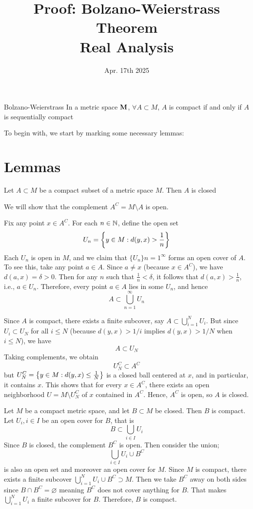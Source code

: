 \documentclass[12pt, letterpaper]{article}
\title{Proof: Bolzano-Weierstrass Theorem\\
Real Analysis}
\date{Apr. 17th 2025}
\begin{document}
\maketitle
\begin{thm}{Bolzano-Weierstrass}
In a metric space $\vb{M}$, $\forall A\subset M$, $A$ is compact if and only if $A$ is sequentially compact
\end{thm}


\begin{prf*}
To begin with, we start by marking some necessary lemmas: \\

\section{Lemmas}
\begin{lem}{Let $A \subset M$ be a compact subset of a metric space $M$. Then $A$ is closed} 
\end{lem}

We will show that the complement $A^C = M \setminus A$ is open.

Fix any point $x \in A^C$. For each $n \in \mathbb{N}$, define the open set
$$U_n = \qty{ y \in M : d(y,x) > \frac{1}{n} }$$
Each $U_n$ is open in $M$, and we claim that $\{ U_n \}{n=1}^\infty$ forms an open cover of $A$. To see this, take any point $a \in A$. Since $a \neq x$ (because $x \in A^C$), we have $d(a,x) = \delta > 0$. Then for any $n$ such that $\frac{1}{n} < \delta$, it follows that $d(a,x) > \frac{1}{n}$, i.e., $a \in U_n$. Therefore, every point $a \in A$ lies in some $U_n$, and hence
$$A \subset \bigcup_{n=1}^\infty U_n$$

Since $A$ is compact, there exists a finite subcover, say $A \subset \bigcup_{i=1}^N U_i$. But since $U_i \subset U_N$ for all $i \leq N$ (because $d(y,x) > 1/i$ implies $d(y,x) > 1/N$ when $i \leq N$), we have
$$A \subset U_N$$
Taking complements, we obtain
$$U_N^C \subset A^C$$
but $U_N^C = \qty{ y \in M : d(y,x) \leq \frac{1}{N} }$ is a closed ball centered at $x$, and in particular, it contains $x$. This shows that for every $x \in A^C$, there exists an open neighborhood $U = M \setminus U_N^C$ of $x$ contained in $A^C$. Hence, $A^C$ is open, so $A$ is closed.\\


\begin{lem}{Let $M$ be a compact metric space, and let $B \subset M$ be closed. Then $B$ is compact.}\\

Let $U_i, i\in I$ be an open cover for $B$, that is
$$B\subset \bigcup_{i\in I} U_i$$
Since $B$ is closed, the complement $B^C$ is open. Then consider the union; 
$$\bigcup_{i\in I} U_i\cup B^C$$
is also an open set and moreover an open cover for $M$. Since $M$ is compact, there exists a finite subcover $\bigcup_{i=1}^N U_i\cup B^C\supset M$. Then we take $B^C$ away on both sides since $B\cap B^C = \varnothing$ meaning $B^C$ does not cover anything for $B$. That makes $\bigcup_{i=1}^N U_i$ a finite subcover for $B$. Therefore, $B$ is compact. 
\end{lem}


\end{prf*}
\end{document}
